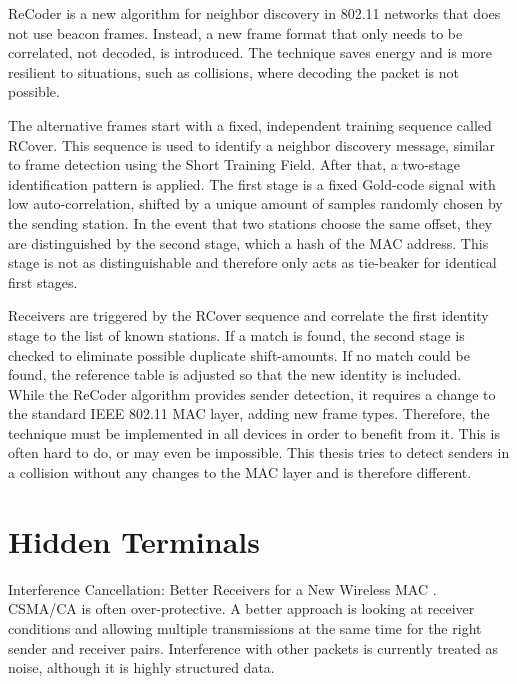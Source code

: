 ReCoder \cite{meng2015} is a new algorithm for neighbor discovery in 802.11 networks that does not use beacon frames. Instead, a new frame format that only needs to be correlated, not decoded, is introduced. The technique saves energy and is more resilient to situations, such as collisions, where decoding the packet is not possible.

The alternative frames start with a fixed, independent training sequence called RCover. This sequence is used to identify a neighbor discovery message, similar to frame detection using the Short Training Field. After that, a two-stage identification pattern is applied. The first stage is a fixed Gold-code signal with low auto-correlation, shifted by a unique amount of samples randomly chosen by the sending station. In the event that two stations choose the same offset, they are distinguished by the second stage, which a hash of the MAC address. This stage is not as distinguishable and therefore only acts as tie-beaker for identical first stages.

Receivers are triggered by the RCover sequence and correlate the first identity stage to the list of known stations. If a match is found, the second stage is checked to eliminate possible duplicate shift-amounts. If no match could be found, the reference table is adjusted so that the new identity is included.\\

While the ReCoder algorithm provides sender detection, it requires a change to the standard IEEE 802.11 MAC layer, adding new frame types. Therefore, the technique must be implemented in all devices in order to benefit from it. This is often hard to do, or may even be impossible. This thesis tries to detect senders in a collision without any changes to the MAC layer and is therefore different.



\section{Hidden Terminals}

Interference Cancellation: Better Receivers for a New Wireless MAC \cite{halperin2007}.\\

CSMA/CA is often over-protective. A better approach is looking at receiver conditions and allowing multiple transmissions at the same time for the right sender and receiver pairs. Interference with other packets is currently treated as noise, although it is highly structured data.

